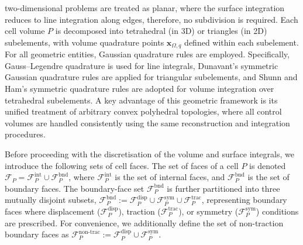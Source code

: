 \documentclass[sn-mathphys,Numbered]{sn-jnl}%
\newcommand{\bb}{\boldsymbol}
\begin{document}
two-dimensional problems are treated as planar, where the surface integration reduces to line integration along edges,
therefore, no subdivision is required.
Each cell volume $P$ is decomposed into tetrahedral
(in 3D) or triangles (in 2D) subelements, with volume quadrature points $\bb{x}_{\Omega,q}$ defined within each subelement.
For all geometric entities, Gaussian quadrature rules are employed.
Specifically, Gauss–Legendre quadrature is used for line integrals,
Dunavant’s symmetric Gaussian quadrature rules \cite{Dunavant1985} are applied for triangular subelements,
and Shunn and Ham’s symmetric quadrature rules \cite{Shunn2012} are adopted for volume integration over tetrahedral subelements.
A key advantage of this geometric framework is its unified treatment of arbitrary convex polyhedral topologies, where all control
volumes are handled consistently using the same reconstruction and integration procedures.

Before proceeding with the discretisation of the volume and surface integrals, we introduce the following sets of cell faces.
The set of faces of a cell $P$ is denoted $\mathcal{F}_P=\mathcal{F}^{\text{int}}_P \cup \mathcal{F}^{\text{bnd}}_P$, 
where $\mathcal{F}_P^{\text{int}}$ is the set of internal faces, and $\mathcal{F}_P^{\text{bnd}}$ is the set of boundary faces.
The boundary-face set $\mathcal{F}_P^{\text{bnd}}$ is further partitioned into three mutually disjoint subsets,
$\mathcal{F}_P^{\mathrm{bnd}} := \mathcal{F}_P^{\text{disp}} \cup \mathcal{F}_P^{\text{sym}} \cup \mathcal{F}_P^{\text{trac}}$,
representing boundary faces where displacement ($\mathcal{F}_P^{\text{disp}}$), traction ($\mathcal{F}_P^{\text{trac}}$),
 or symmetry ($\mathcal{F}_P^{\text{sym}}$) conditions are prescribed. For convenience, we additionally define the set of non-traction boundary faces as $\mathcal{F}_P^{\text{non-trac}} := \mathcal{F}_P^{\text{disp}} \cup \mathcal{F}_P^{\text{sym}}$.
%
\end{document}
